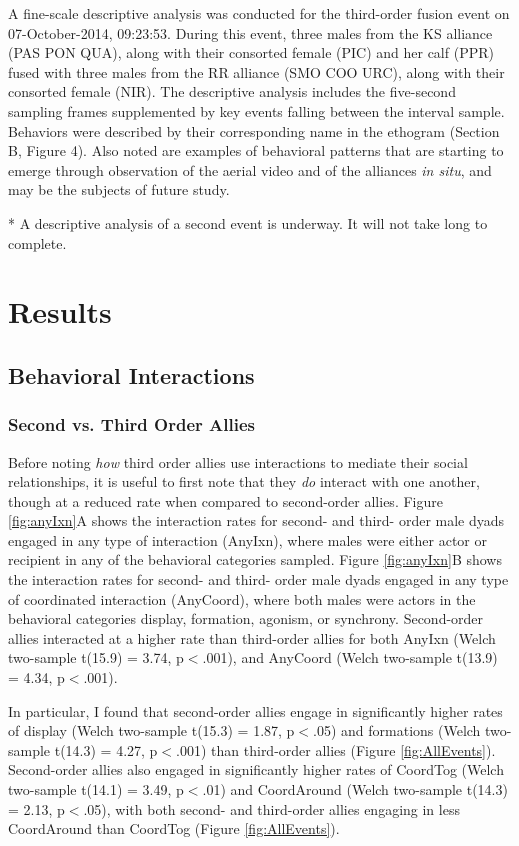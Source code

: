 \documentclass[11pt]{amsart}
\begin{document}
A fine-scale descriptive analysis was conducted for the third-order fusion event on 07-October-2014, 09:23:53. During this event, three males from the KS alliance (PAS PON QUA), along with their consorted female (PIC) and her calf (PPR) fused with three males from the RR alliance (SMO COO URC), along with their consorted female (NIR). The descriptive analysis includes the five-second sampling frames supplemented by key events falling between the interval sample. Behaviors were described by their corresponding name in the ethogram (Section B, Figure 4). Also noted are examples of behavioral patterns that are starting to emerge through observation of the aerial video and of the alliances \textit{in situ}, and may be the subjects of future study.

* A descriptive analysis of a second event is underway. It will not take long to complete.

\section{Results}
\subsection{Behavioral Interactions}
\subsubsection{Second vs. Third Order Allies}
Before noting \emph{how} third order allies use interactions to mediate their social relationships, it is useful to first note that they \emph{do} interact with one another, though at a reduced rate when compared to second-order allies. Figure \ref{fig:anyIxn}A shows the interaction rates for second- and third- order male dyads engaged in any type of interaction (AnyIxn), where males were either actor or recipient in any of the behavioral categories sampled. Figure \ref{fig:anyIxn}B shows the interaction rates for second- and third- order male dyads engaged in any type of coordinated interaction (AnyCoord), where both males were actors in the behavioral categories display, formation, agonism, or synchrony. Second-order allies interacted at a higher rate than third-order allies for both AnyIxn (Welch two-sample t(15.9) = 3.74, p$<$.001), and AnyCoord (Welch two-sample t(13.9) = 4.34, p$<$.001).

In particular, I found that second-order allies engage in significantly higher rates of display (Welch two-sample t(15.3) = 1.87, p$<$.05) and formations (Welch two-sample t(14.3) = 4.27, p$<$.001) than third-order allies (Figure \ref{fig:AllEvents}). Second-order allies also engaged in significantly higher rates of CoordTog (Welch two-sample t(14.1) = 3.49, p$<$.01) and CoordAround (Welch two-sample t(14.3) =  2.13, p$<$.05), with both second- and third-order allies engaging in less CoordAround than CoordTog (Figure \ref{fig:AllEvents}). 
\end{document}
